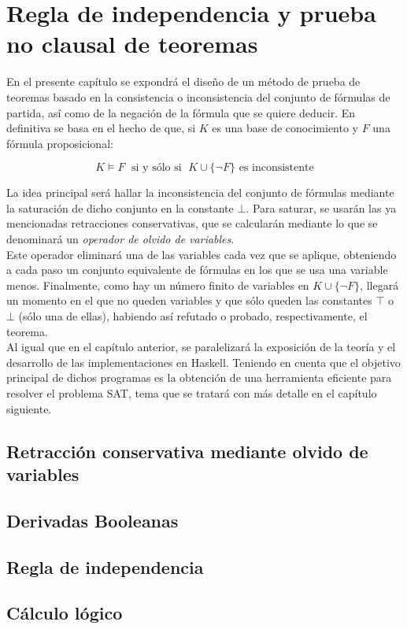 \chapter{Regla de independencia y prueba no clausal de teoremas}

En el presente capítulo se expondrá el diseño de un método de prueba de teoremas basado en la consistencia o inconsistencia del conjunto de fórmulas de partida, así como de la negación de la fórmula que se quiere deducir. En definitiva se basa en el hecho de que, si $K$ es una base de conocimiento y $F$ una fórmula proposicional:

$$K\vDash F \;\text{ si y sólo si }\; K \cup \{ \neg F \} \text{ es inconsistente}$$

La idea principal será hallar la inconsistencia del conjunto de fórmulas mediante la saturación de dicho conjunto en la constante $\bot$. Para saturar, se usarán las ya mencionadas retracciones conservativas,  que se calcularán mediante lo que se denominará un \textit{operador de olvido de variables}. \\

Este operador eliminará una de las variables cada vez que se aplique, obteniendo a cada paso un conjunto equivalente de fórmulas en los que se usa una variable menos. Finalmente, como hay un número finito de variables en $K \cup \{ \neg F \} $, llegará un momento en el que no queden variables y que sólo queden las constantes $\top$ o $\bot$ (sólo una de ellas), habiendo así refutado o probado, respectivamente, el teorema.\\

Al igual que en el capítulo anterior, se paralelizará la exposición de la teoría y el desarrollo de las implementaciones en Haskell. Teniendo en cuenta que el objetivo principal de dichos programas es la obtención de una herramienta eficiente para resolver el problema SAT, tema que se tratará con más detalle en el capítulo siguiente.

\section{Retracción conservativa mediante olvido de variables}

\section{Derivadas Booleanas}

\section{Regla de independencia}

\section{Cálculo lógico}